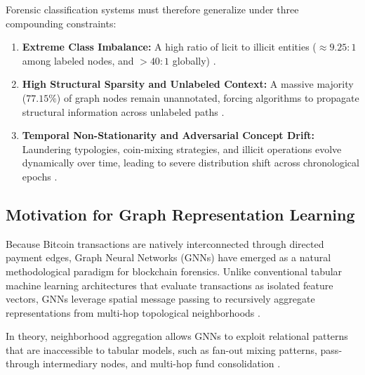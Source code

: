 \documentclass[conference]{IEEEtran}
\begin{document}
Forensic classification systems must therefore generalize under three compounding constraints:
\begin{enumerate}
    \item \textbf{Extreme Class Imbalance:} A high ratio of licit to illicit entities ($\approx 9.25:1$ among labeled nodes, and $>40:1$ globally) \cite{he2009learning}.
    \item \textbf{High Structural Sparsity and Unlabeled Context:} A massive majority ($77.15\%$) of graph nodes remain unannotated, forcing algorithms to propagate structural information across unlabeled paths \cite{weber2019elliptic}.
    \item \textbf{Temporal Non-Stationarity and Adversarial Concept Drift:} Laundering typologies, coin-mixing strategies, and illicit operations evolve dynamically over time, leading to severe distribution shift across chronological epochs \cite{gama2014survey, quinonero2009dataset}.
\end{enumerate}

\subsection{Motivation for Graph Representation Learning}
Because Bitcoin transactions are natively interconnected through directed payment edges, Graph Neural Networks (GNNs) \cite{bronstein2017geometric, wu2020comprehensive} have emerged as a natural methodological paradigm for blockchain forensics. Unlike conventional tabular machine learning architectures that evaluate transactions as isolated feature vectors, GNNs leverage spatial message passing to recursively aggregate representations from multi-hop topological neighborhoods \cite{kipf2017semi, hamilton2017inductive, velickovic2018graph}.

In theory, neighborhood aggregation allows GNNs to exploit relational patterns that are inaccessible to tabular models, such as fan-out mixing patterns, pass-through intermediary nodes, and multi-hop fund consolidation \cite{weber2019elliptic}.
\end{document}
